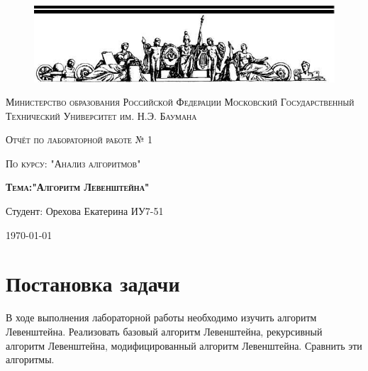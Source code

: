 \documentclass[a4paper,12pt]{article}
\begin{document}
\begin{titlepage}
	\centering
    \begin{figure}[H]
    \includegraphics[width = 120mm]{photo}
    \end{figure}
	{\scshape Министерство образования Российской Федерации
Московский Государственный Технический Университет им. Н.Э. Баумана \par}
	\vspace{4cm}
	{\scshape\Large Отчёт по лабораторной работе № 1\par}
    {\scshape\Large По курсу: "Анализ алгоритмов"\par}
	{\scshape\Large\bf Тема:"Алгоритм Левенштейна"\par}
    \vspace{4cm}
    {\flushright Студент: Орехова Екатерина ИУ7-51\par}
    \vspace{4cm}
	{\large \today\par}
\end{titlepage}

\def\contentaname{Содержание}
\tableofcontents %
\clearpage

\section{Постановка задачи}
    В ходе выполнения лабораторной работы необходимо изучить алгоритм Левенштейна. Реализовать базовый алгоритм Левенштейна, рекурсивный алгоритм Левенштейна, модифицированный алгоритм Левенштейна. Сравнить эти алгоритмы.
\end{document}
